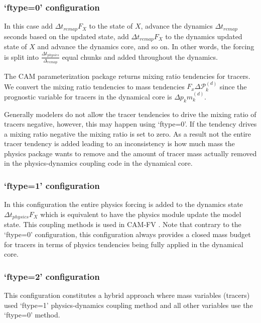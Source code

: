 \documentclass{agujournal}
\begin{document}
\subsubsection{`ftype=0' configuration}
In this case add $\Delta t_{remap}F_X$ to the state of $X$, advance the dynamics $\Delta t_{remap}$ seconds based on the updated state, add $\Delta t_{remap}F_X$ to the dynamics updated state of $X$ and advance the dynamics core, and so on. In other words, the forcing is split into $\frac{\Delta t_{physics}}{\Delta_{remap}}$ equal chunks and added throughout the dynamics. 

The CAM parameterization package returns mixing ratio tendencies for tracers. We convert the mixing ratio tendencies to mass tendencies $F_x \Delta \mathcal{P}^{(d)}_k$ since the prognostic variable for tracers in the dynamical core is $\Delta p_k m^{(d)}_k$.

Generally modelers do not allow the tracer tendencies to drive the mixing ratio of tracers negative, however, this may happen using `ftype=0'. If the tendency drives a mixing ratio negative the mixing ratio is set to zero. As a result not the entire tracer tendency is added leading to an inconsistency is how much mass the physics package wants to remove and the amount of tracer mass actually removed in the physics-dynamics coupling code in the dynamical core.
\subsubsection{`ftype=1' configuration}
In this configuration the entire physics forcing is added to the dynamics state $\Delta t_{physics}F_X$ which is equivalent to have the physics module update the model state. This coupling methods is used in CAM-FV \citep{L2004MWR}. Note that contrary to the `ftype=0' configuration, this configuration always provides a closed mass budget for tracers in terms of physics tendencies being fully applied in the dynamical core.
\subsubsection{`ftype=2' configuration}
This configuration constitutes a hybrid approach where mass variables (tracers) used `ftype=1' physics-dynamics coupling method and all other variables use the `ftype=0' method.


\end{document}
